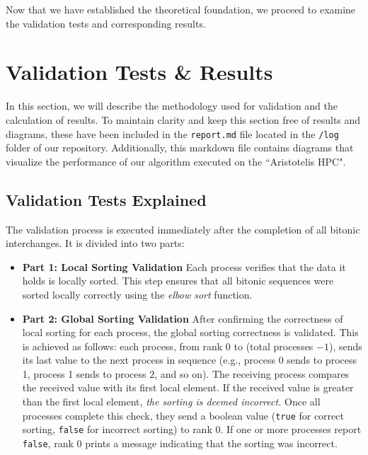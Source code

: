\documentclass[12pt]{article}
\begin{document}
Now that we have established the theoretical foundation, we proceed to examine the validation tests and corresponding results.


\newpage

\pagestyle{fancy}
\chead{}

\section{Validation Tests \& Results}

In this section, we will describe the methodology used for validation and the calculation of results. To maintain clarity and keep this section free of results and diagrams, these have been included in the \texttt{report.md} file located in the \texttt{/log} folder of our repository. Additionally, this markdown file contains diagrams that visualize the performance of our algorithm executed on the ``Aristotelis HPC".


\subsection{Validation Tests Explained}

The validation process is executed immediately after the completion of all bitonic interchanges. It is divided into two parts:

\begin{itemize}
    \item \textbf{Part 1: Local Sorting Validation}  
    Each process verifies that the data it holds is locally sorted. This step ensures that all bitonic sequences were sorted locally correctly using the \textit{elbow sort} function.

    \item \textbf{Part 2: Global Sorting Validation}  
    After confirming the correctness of local sorting for each process, the global sorting correctness is validated. This is achieved as follows: each process, from rank 0 to (total processes $- 1$), sends its last value to the next process in sequence (e.g., process 0 sends to process 1, process 1 sends to process 2, and so on). The receiving process compares the received value with its first local element. If the received value is greater than the first local element, \textit{the sorting is deemed incorrect. } 
    Once all processes complete this check, they send a boolean value (\texttt{true} for correct sorting, \texttt{false} for incorrect sorting) to rank 0. If one or more processes report \texttt{false}, rank 0 prints a message indicating that the sorting was incorrect.
\end{itemize}
\end{document}
